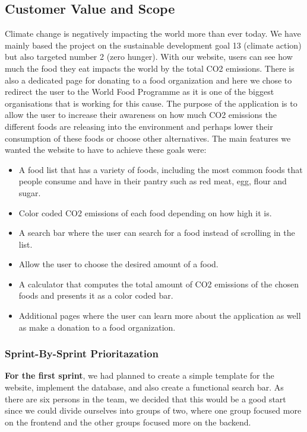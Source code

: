 \subsection{Customer Value and Scope}
Climate change is negatively impacting the world more than ever today. We have mainly based the project on the sustainable development goal 13 (climate action) but also targeted number 2 (zero hunger). With our website, users can see how much the food they eat impacts the world by the total CO2 emissions. There is also a dedicated page for donating to a food organization and here we chose to redirect the user to the World Food Programme as it is one of the biggest organisations that is working for this cause. The purpose of the application is to allow the user to increase their awareness on how much CO2 emissions the different foods are releasing into the environment and perhaps lower their consumption of these foods or choose other alternatives.
The main features we wanted the website to have to achieve these goals were:
\begin{itemize}
\item A food list that has a variety of foods, including the most common foods that people consume and have in their pantry such as red meat, egg, flour and sugar. 
\item Color coded CO2 emissions of each food depending on how high it is. 
\item A search bar where the user can search for a food instead of scrolling in the list. 
\item Allow the user to choose the desired amount of a food.  
\item A calculator that computes the total amount of CO2 emissions of the chosen foods and presents it as a color coded bar. 
\item Additional pages where the user can learn more about the application as well as make a donation to a food organization.
\end{itemize}
\subsubsection{Sprint-By-Sprint Prioritazation}
\textbf{For the first sprint}, we had planned to create a simple template for the website, implement the database, and also create a functional search bar. As there are six persons in the team, we decided that this would be a good start since we could divide ourselves into groups of two, where one group focused more on the frontend and the other groups focused more on the backend. 

